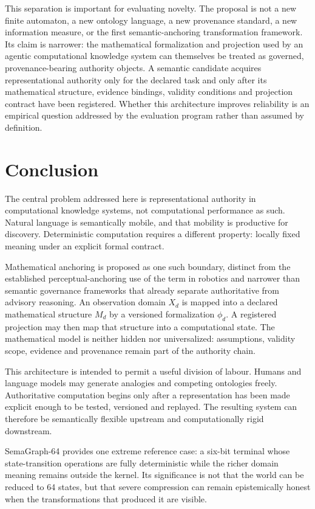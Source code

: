 \documentclass[11pt,a4paper]{article}
\begin{document}
This separation is important for evaluating novelty. The proposal is not a new finite automaton, a new ontology language, a new provenance standard, a new information measure, or the first semantic-anchoring transformation framework. Its claim is narrower: the mathematical formalization and projection used by an agentic computational knowledge system can themselves be treated as governed, provenance-bearing authority objects. A semantic candidate acquires representational authority only for the declared task and only after its mathematical structure, evidence bindings, validity conditions and projection contract have been registered. Whether this architecture improves reliability is an empirical question addressed by the evaluation program rather than assumed by definition.

\section{Conclusion}
The central problem addressed here is representational authority in computational knowledge systems, not computational performance as such. Natural language is semantically mobile, and that mobility is productive for discovery. Deterministic computation requires a different property: locally fixed meaning under an explicit formal contract.

Mathematical anchoring is proposed as one such boundary, distinct from the established perceptual-anchoring use of the term in robotics and narrower than semantic governance frameworks that already separate authoritative from advisory reasoning. An observation domain $X_d$ is mapped into a declared mathematical structure $M_d$ by a versioned formalization $\phi_d$. A registered projection may then map that structure into a computational state. The mathematical model is neither hidden nor universalized: assumptions, validity scope, evidence and provenance remain part of the authority chain.

This architecture is intended to permit a useful division of labour. Humans and language models may generate analogies and competing ontologies freely. Authoritative computation begins only after a representation has been made explicit enough to be tested, versioned and replayed. The resulting system can therefore be semantically flexible upstream and computationally rigid downstream.

SemaGraph-64 provides one extreme reference case: a six-bit terminal whose state-transition operations are fully deterministic while the richer domain meaning remains outside the kernel. Its significance is not that the world can be reduced to 64 states, but that severe compression can remain epistemically honest when the transformations that produced it are visible.
\end{document}
